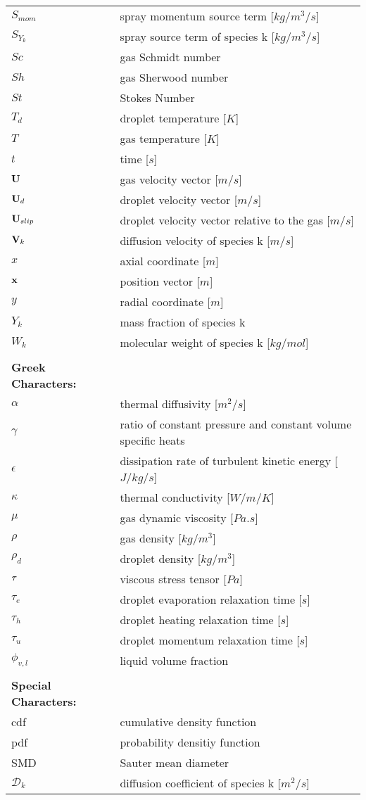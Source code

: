 \begin{longtable}{ll}
$S_{mom}$ & spray momentum source term [$kg/m^3/s$]\\
$S_{Y_k}$ & spray source term of species k [$kg/m^3/s$]\\
$Sc$ & gas Schmidt number \\
$Sh$ & gas Sherwood number \\
$St$ & Stokes Number \\
$T_d$ & droplet temperature [$K$]\\
$T$ & gas temperature [$K$]\\
$t$ & time [$s$]\\
$\mathbf{U}$ & gas velocity vector [$m/s$]\\
$\mathbf{U}_d$ & droplet velocity vector [$m/s$]\\
$\mathbf{U}_{slip}$ & droplet velocity vector relative to the gas [$m/s$]\\
$\mathbf{V}_k$ & diffusion velocity of species k [$m/s$]\\
$x$ & axial coordinate [$m$]\\
$\mathbf{x}$ & position vector [$m$] \\
$y$ & radial coordinate [$m$]\\
$Y_k$ & mass fraction of species k\\
$W_k$ & molecular weight of species k [$kg/mol$]\\
\\

\textbf{Greek Characters:} & \\
$\alpha$ & thermal diffusivity [$m^2/s$]\\
$\gamma$ & ratio of constant pressure and constant volume specific heats \\
$\epsilon$ & dissipation rate of turbulent kinetic energy [$J/kg/s$]\\
$\kappa$ & thermal conductivity [$W/m/K$]\\
$\mu$ & gas dynamic viscosity [$Pa.s$]\\
$\rho$ & gas density [$kg/m^3$]\\
$\rho_d$ & droplet density [$kg/m^3$]\\
$\mathbf{\tau}$ & viscous stress tensor [$Pa$]\\
$\tau_e$ & droplet evaporation relaxation time [$s$]\\
$\tau_h$ & droplet heating relaxation time [$s$]\\
$\tau_u$ & droplet momentum relaxation time [$s$] \\
$\phi_{v,l}$ & liquid volume fraction \\
\\

\textbf{Special Characters:} & \\
cdf & cumulative density function\\
pdf & probability densitiy function\\
SMD & Sauter mean diameter \\
$\mathcal{D}_k$ & diffusion coefficient of species k [$m^2/s$]
\end{longtable}

